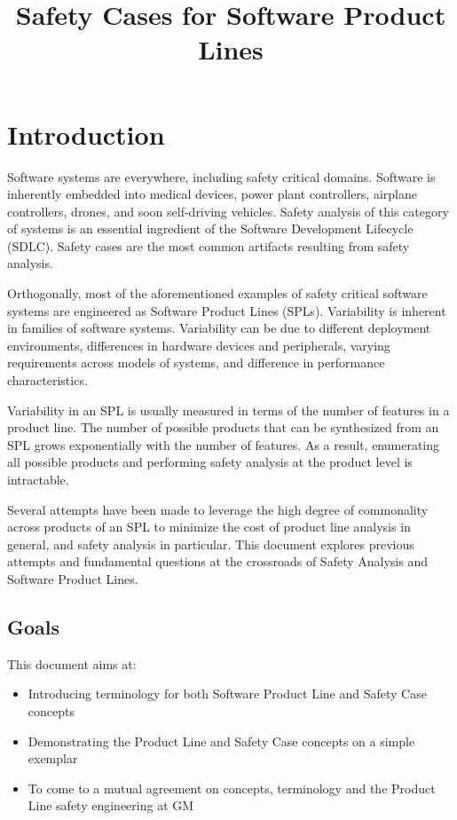 \documentclass[11pt]{article}
\title{Safety Cases for Software Product Lines}
\date{}                                           %
\begin{document}
\maketitle


\section{Introduction}
Software systems are everywhere, including safety critical domains. Software is inherently embedded into medical devices, power plant controllers, airplane controllers, drones, and soon self-driving vehicles. Safety analysis of this category of systems is an essential ingredient of the Software Development Lifecycle (SDLC). Safety cases are the most common artifacts resulting from safety analysis.

Orthogonally, most of the aforementioned examples of safety critical software systems are engineered as Software Product Lines (SPLs). Variability is inherent in families of software systems. Variability can be due to different deployment environments, differences in hardware devices and peripherals, varying requirements across models of systems, and difference in performance characteristics.

Variability in an SPL is usually measured in terms of the number of features in a product line. The number of possible products that can be synthesized from an SPL grows exponentially with the number of features. As a result, enumerating all possible products and performing safety analysis at the product level is intractable. 

Several attempts have been made to leverage the high degree of commonality across products of an SPL to minimize the cost of product line analysis in general, and safety analysis in particular. This document explores previous attempts and fundamental questions at the crossroads of Safety Analysis and Software Product Lines.

\subsection{Goals}
This document aims at:
\begin{itemize}
\item Introducing terminology for both Software Product Line and Safety Case concepts
\item Demonstrating the Product Line and Safety Case concepts on a simple exemplar
\item To come to a mutual agreement on concepts, terminology and the Product Line safety engineering at GM
\end{itemize}
\end{document}
